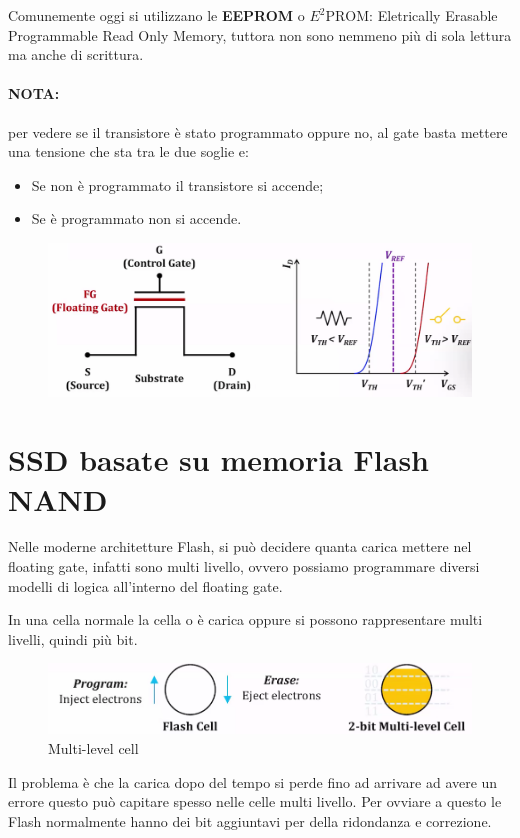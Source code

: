 Comunemente oggi si utilizzano le \textbf{EEPROM} o \textbf{$E^2\text{PROM}$}: Eletrically Erasable Programmable Read Only Memory, tuttora non sono nemmeno più di sola lettura ma anche di scrittura.

\paragraph{NOTA:} per vedere se il transistore è stato programmato oppure no, al gate basta mettere una tensione che sta tra le due soglie e:

\begin{itemize}
    \item Se non è programmato il transistore si accende;
    \item Se è programmato non si accende.
\end{itemize}




\begin{figure}[htbp]
    \centering
    \includegraphics[width=0.6\linewidth]{img/dnfg.png}
\end{figure}

\newpage
\section{SSD basate su memoria Flash NAND}

Nelle moderne architetture Flash, si può decidere quanta carica mettere nel floating gate, infatti sono multi livello, ovvero possiamo programmare diversi modelli di logica all'interno del floating gate.

In una cella normale la cella o è carica oppure si possono rappresentare multi livelli, quindi più bit.

\begin{figure}[htbp]
    \centering
    \includegraphics[width=0.55\linewidth]{img/nmfhg.png}
    \caption{Multi-level cell}
\end{figure}

Il problema è che la carica dopo del tempo si perde fino ad arrivare ad avere un errore questo può capitare spesso nelle celle multi livello. Per ovviare a questo le Flash normalmente hanno dei bit aggiuntavi per della ridondanza e correzione. 
